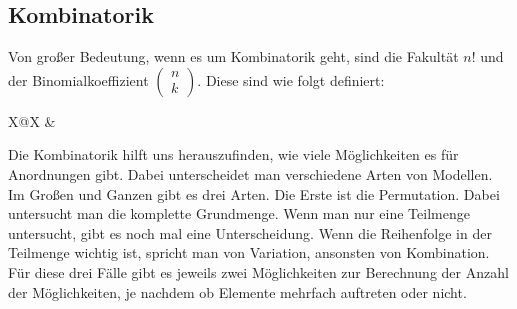 \documentclass[12pt]{article}
\begin{document}
		\subsection{Kombinatorik}
		Von großer Bedeutung, wenn es um Kombinatorik geht, sind die Fakultät $n!$ und der Binomialkoeffizient $\begin{pmatrix}n\\k\end{pmatrix}$. Diese sind wie folgt definiert:
		\begin{center}
			\bgroup
			\def\arraystretch{0}
			\def\tabcolsep{0pt}
			\begin{tabularx}{\linewidth}{X@{\hspace{0.4cm}}X}
				&
			\end{tabularx}
			\egroup
		\end{center}
		Die Kombinatorik hilft uns herauszufinden, wie viele Möglichkeiten es für Anordnungen gibt. Dabei unterscheidet man verschiedene Arten von Modellen. Im Großen und Ganzen gibt es drei Arten. Die Erste ist die Permutation. Dabei untersucht man die komplette Grundmenge. Wenn man nur eine Teilmenge untersucht, gibt es noch mal eine Unterscheidung. Wenn die Reihenfolge in der Teilmenge wichtig ist, spricht man von Variation, ansonsten von Kombination. Für diese drei Fälle gibt es jeweils zwei Möglichkeiten zur Berechnung der Anzahl der Möglichkeiten, je nachdem ob Elemente mehrfach auftreten oder nicht.
\end{document}
